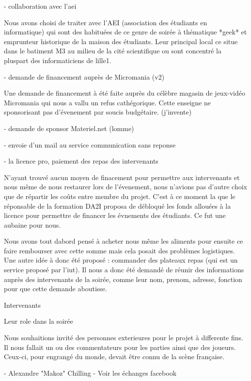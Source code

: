     - collaboration avec l'aei

      Nous avons choisi de traiter avec l'AEI (association des étudiants
      en informatique) qui sont des habituées de ce genre de soirée à
      thématique *geek* et emprunteur historique de la maison des étudiants.
      Leur principal local ce situe dans le batiment M3 au milieu de la
      cité scientifique ou sont concentré la pluspart des informaticiens de
      lille1.

    - demande de financement auprès de Micromania (v2)

      Une demande de financement à été faite auprès du célèbre magasin de
      jeux-vidéo Micromania qui nous a vallu un refus cathégorique. Cette
      enseigne ne sponsorisant pas d'évenement par soucis
      budgétaire. (j'invente)

    - demande de sponsor Materiel.net (lomme)

    - envoie d'un mail au service communication sans reponse

    - la licence pro, paiement des repas des intervenants

      N'ayant trouvé aucun moyen de finacement pour permettre aux
      intervenants et nous même de nous restaurer lors de l'évenement, nous
      n'avions pas d'autre choix que de répartir les coûts entre membre du
      projet. C'est à ce moment la que le réponsable de la formation DA2I
      proposa de débloqué les fonds allouées à la licence pour permettre de
      financer les évnements des étudiants. Ce fut une aubaine pour nous.

      Nous avons tout dabord pensé à acheter nous même les aliments pour
      ensuite ce faire rembourser avec cette somme mais cela posait des
      problèmes logistiques. Une autre idée à donc été proposé : commander des
      plateaux repas (qui est un service proposé par l'iut). Il nous a donc
      été demandé de réunir des informations auprès des intervenants de la
      soirée, comme leur nom, prenom, adresse, fonction pour que cette demande
      aboutisse.

	Intervenants

    Leur role dans la soirée

      Nous souhaitions invité des personnes exterieures pour le projet à
      differente fins. Il nous fallait un ou des commentateurs pour les
      parties ainsi que des joueurs. Ceux-ci, pour engrangé du monde, devait
      être connu de la scène française.


    - Alexandre "Makoz" Chilling
      - Voir les échanges facebook

